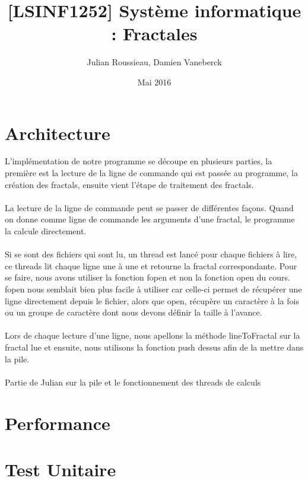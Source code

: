 \documentclass[11pt]{article}
\title{[LSINF1252] Système informatique : Fractales}
\author{Julian Roussieau, Damien Vaneberck }
\date{Mai 2016}
\begin{document}
\maketitle

\section{Architecture}

L'implémentation de notre programme se découpe en plusieurs parties, la première est la lecture de la ligne de commande qui est passée au programme, la création des fractals, ensuite vient l'étape de traitement des fractals.
\\
\\
La lecture de la ligne de commande peut se passer de différentes façons. Quand on donne comme ligne de commande les arguments d'une fractal, le programme la calcule directement.
\\
\\
Si se sont des fichiers qui sont lu, un thread est lancé pour chaque fichiers à lire, ce threads lit chaque ligne une à une et retourne la fractal correspondante. Pour se faire, nous avons utiliser la fonction fopen et non la fonction open du cours. fopen nous semblait bien plus facile à utiliser car celle-ci permet de récupérer une ligne directement depuis le fichier, alors que open, récupère un caractère à la fois ou un groupe de caractère dont nous devons définir la taille à l'avance.
\\
\\
Lors de chaque lecture d'une ligne, nous apellons la méthode lineToFractal sur la fractal lue et ensuite, nous utilisons la fonction push dessus afin de la mettre dans la pile.
\\
\\
Partie de Julian sur la pile et le fonctionnement des threads de calculs
\\





\section{Performance}

\section{Test Unitaire}
\end{document}

